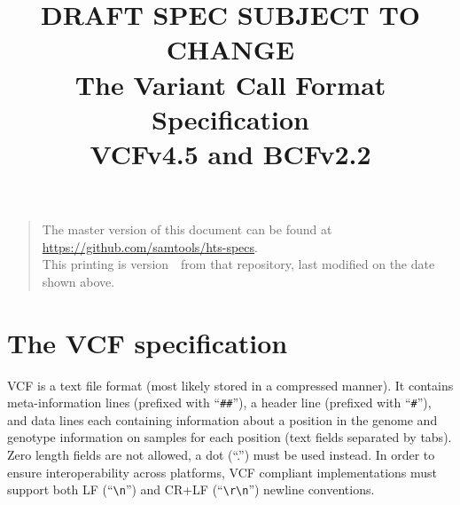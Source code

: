 \documentclass[8pt]{article}
\begin{document}

\title{\huge \color{red} DRAFT SPEC SUBJECT TO CHANGE \\ The Variant Call Format Specification \\ \vspace{0.5em} \large VCFv4.5 and BCFv2.2}
\date{\headdate}
\maketitle
\begin{quote}\small
The master version of this document can be found at \url{https://github.com/samtools/hts-specs}.\\
This printing is version~\commitdesc\ from that repository, last modified on the date shown above.
\end{quote}
\vspace*{1em}

\newpage
\tableofcontents
\newpage

\section{The VCF specification}
VCF is a text file format (most likely stored in a compressed manner).
It contains meta-information lines (prefixed with ``\verb|##|''), a header line (prefixed with ``\verb|#|''), and data lines each containing information about a position in the genome and genotype information on samples for each position (text fields separated by tabs).
Zero length fields are not allowed, a dot (``.'') must be used instead.
In order to ensure interoperability across platforms, VCF compliant implementations must support both LF (``\verb|\n|'') and CR+LF (``\verb|\r\n|'') newline conventions.
\end{document}
